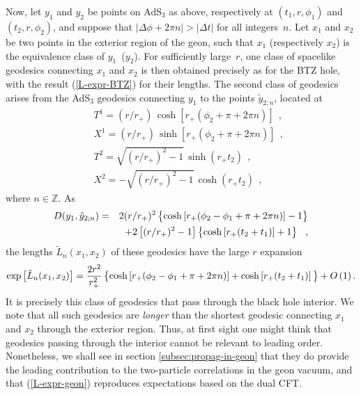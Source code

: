 \documentclass[a4paper,12pt]{article}
\begin{document}
Now, let $y_1$ and $y_2$ be points on AdS$_3$ as above, 
respectively at
$(t_1,r,\phi_1)$ and 
$(t_2,r,\phi_2)$, and suppose that 
$|\Delta \phi+ 2\pi n| > |\Delta t|$ for all integers~$n$. 
Let $x_1$ and $x_2$ be two points in the exterior region of the
geon, such that $x_1$ (respectively $x_2$) is the equivalence class of
$y_1$~($y_2$).  
For sufficiently large~$r$, one class of spacelike
geodesics connecting $x_1$ and $x_2$ is then obtained precisely as for
the BTZ hole, with the result (\ref{L-expr-BTZ}) for their lengths.
The second class of geodesics arises from the AdS$_3$ geodesics
connecting $y_1$ to the points ${\tilde y}_{2;n}$, located at
\begin{eqnarray}
&&T^1 = (r/r_+) \, \cosh[r_+ (\phi_2 + \pi + 2\pi n )] 
\ \ , 
\nonumber
\\
&&X^1 = (r/r_+) \, \sinh[r_+ (\phi_2 + \pi + 2\pi n)] 
\ \ , 
\nonumber
\\
&&T^2 = \sqrt{(r/r_+)^2 -1} 
\, 
\sinh(r_+ t_2) 
\ \ , 
\nonumber
\\
&&X^2 = - \sqrt{(r/r_+)^2 -1} 
\, 
\cosh(r_+ t_2) 
\ \ , 
\label{xtildetwo-location}
\end{eqnarray}
where $n\in\mathbb Z$. 
As 
\begin{eqnarray}
D(y_1,{\tilde y}_{2;n}) 
&=& 
2(r/r_+)^2 
\left\{ 
\cosh\left[r_+(\phi_2 - \phi_1 + \pi + 2\pi n )\right] -1 
\vphantom{A^A_A}
\right\} 
\nonumber
\\
&&
+ 
2 \left[ (r/r_+)^2 -1 \right] 
\left\{ 
\cosh \left[ r_+ (t_2 + t_1) \right]  + 1 
\vphantom{A^A_A}
\right\}
\ \ , 
\label{Dtilde-geon} 
\end{eqnarray}
the lengths ${\tilde L}_n(x_1,x_2)$ 
of these geodesics have the large $r$ expansion 
\begin{equation}
\exp\left[{\tilde L}_n(x_1,x_2)\right]
= 
\frac{2 r^2}{r_+^2} 
\left\{
\cosh \left[r_+(\phi_2 - \phi_1 + \pi + 2\pi n ) \right] 
+ \cosh\left[r_+ (t_2 + t_1) \right]
\vphantom{A^A_A}
\right\}
+ O\left( 1 \right). 
\label{L-expr-geon}
\end{equation}
It is precisely this class of geodesics that pass through
the black hole interior.  We note that all such geodesics
are {\it longer\/} 
than the shortest geodesic connecting $x_1$
and $x_2$ through the exterior region.  Thus, at first sight
one might think that geodesics passing through the interior
cannot be relevant to leading order.  Nonetheless, we shall
see in section \ref{subsec:propag-in-geon} that they do provide
the leading contribution to the two-particle correlations in the
geon vacuum, and that (\ref{L-expr-geon}) reproduces
expectations based on the dual CFT.
\end{document}
